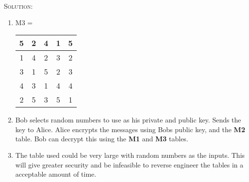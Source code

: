 \documentclass[12pt]{article}
\newenvironment{solution}
    {\textsc{Solution:}\\}
    {\newpage}%
\begin{document}
	\begin{solution}
		\begin{enumerate}[label=\alph*]
			\item \hspace{2em} M3 =\ \
				\begin{tabular}{|c|c|c|c|c|}
					\hline
					5 & 2 & 4 & 1 & 5 \\ \hline
					1 & 4 & 2 & 3 & 2 \\ \hline
					3 & 1 & 5 & 2 & 3 \\ \hline
					4 & 3 & 1 & 4 & 4 \\ \hline
					2 & 5 & 3 & 5 & 1 \\ \hline
				\end{tabular}
			\item Bob selects random numbers to use as his private and public key.
				Sends the key to Alice. Alice encrypts the messages using Bobs
				public key, and the \textbf{M2} table. Bob can decrypt this using
				the \textbf{M1} and \textbf{M3} tables.
			\item The table used could be very large with random numbers as the inputs.
				This will give greater security and be infeasible to reverse 
				engineer the tables in a acceptable amount of time.
		\end{enumerate}
	\end{solution}
\end{document}

